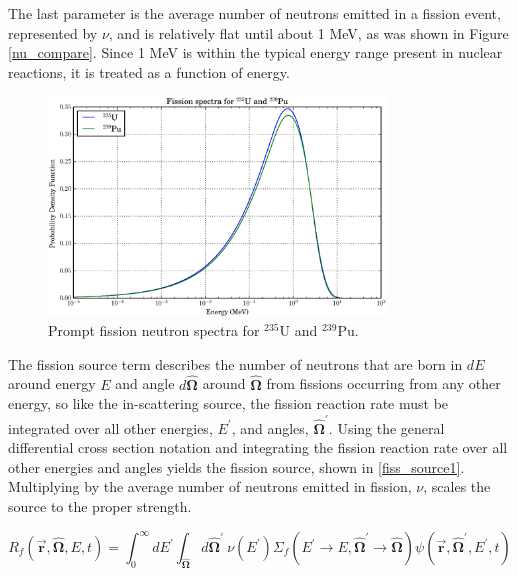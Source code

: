 The last parameter is the average number of neutrons emitted in a fission event, represented by $\nu$, and is relatively flat until about 1 MeV, as was shown in Figure \ref{nu_compare}.  Since 1 MeV is within the typical energy range present in nuclear reactions, it is treated as a function of energy.

\begin{figure}[h!] 
  \centering
    \includegraphics[width=0.8\textwidth ]{graphics/fiss_spec.eps} 
     \caption{Prompt fission neutron spectra for $^{235}$U and $^{239}$Pu. \label{fiss_spec}}
\end{figure}

The fission source term describes the number of neutrons that are born in $dE$ around energy $E$ and angle $d\boldsymbol{\hat{\Omega}}$ around $\boldsymbol{\hat{\Omega}}$ from fissions occurring from any other energy, so like the in-scattering source, the fission reaction rate must be integrated over all other energies, $E^\prime$, and angles, $\boldsymbol{\hat{\Omega}}^\prime$.  Using the general differential cross section notation and integrating the fission reaction rate over all other energies and angles yields the fission source, shown in \eqref{fiss_source1}. Multiplying by the average number of neutrons emitted in fission, $\nu$, scales the source to the proper strength.  

\begin{equation}
\label{fiss_source1}
R_f(\boldsymbol{\vec{r}},\boldsymbol{\hat{\Omega}},E,t) =  \int_0^\infty dE^\prime \int_{\boldsymbol{\hat{\Omega}}} d\boldsymbol{\hat{\Omega}}^\prime \: \nu(E^\prime) \Sigma_f(E^\prime \rightarrow E,\boldsymbol{\hat{\Omega}}^\prime \rightarrow \boldsymbol{\hat{\Omega}}) \psi(\boldsymbol{\vec{r}},\boldsymbol{\hat{\Omega}}^\prime,E^\prime,t)  
 \end{equation}
 
